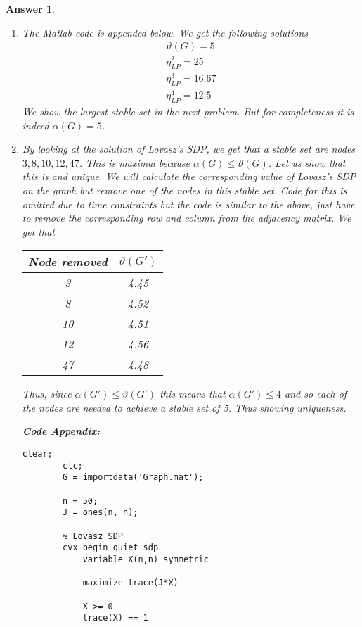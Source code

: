 \documentclass[12pt]{article}
\theoremstyle{colon}
\newtheorem*{answer}{Answer}
\begin{document}
\begin{answer}
\begin{enumerate}[label=\arabic*)]
    \item The Matlab code is appended below. We get the following solutions
      \begin{gather*}
        \vartheta(G) = 5 \\
        \eta_{LP}^2 = 25 \\
        \eta_{LP}^3 = 16.67 \\
        \eta_{LP}^4 = 12.5
      \end{gather*}
      We show the largest stable set in the next problem. But for completeness it is indeed $\alpha(G) = 5$.

    \item By looking at the solution of Lovasz's SDP, we get that a stable set are nodes $3, 8, 10, 12, 47$. This is maximal because $\alpha(G) \leq \vartheta(G)$. Let us show that this is and unique. We will calculate the corresponding value of Lovasz's SDP on the graph but remove one of the nodes in this stable set. Code for this is omitted due to time constraints but the code is similar to the above, just have to remove the corresponding row and column from the adjacency matrix. We get that
      \begin{center}
        \begin{tabular}{c | c}
          Node removed & $\vartheta(G')$ \\
          \hline
          3 & 4.45 \\
          8 & 4.52 \\
          10 & 4.51 \\
          12 & 4.56 \\
          47 & 4.48
        \end{tabular}
      \end{center}
      Thus, since $\alpha(G') \leq \vartheta(G')$ this means that $\alpha(G') \leq 4$ and so each of the nodes are needed to achieve a stable set of 5. Thus showing uniqueness.

      \textbf{Code Appendix:}

      \begin{lstlisting}[style=Matlab-editor, basicstyle=\scriptsize]
        clear;
        clc;
        G = importdata('Graph.mat');

        n = 50;
        J = ones(n, n);

        % Lovasz SDP
        cvx_begin quiet sdp
            variable X(n,n) symmetric

            maximize trace(J*X)

            X >= 0
            trace(X) == 1


\end{lstlisting}
\end{enumerate}
\end{answer}
\end{document}

